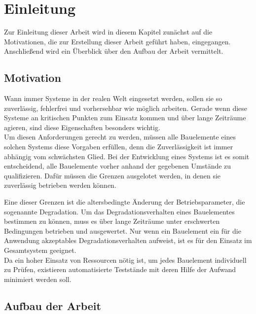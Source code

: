 
\chapter{Einleitung}
\label{chapter_einleitung}
Zur Einleitung dieser Arbeit wird in diesem Kapitel zunächst auf die Motivationen, die zur Erstellung dieser Arbeit geführt haben, eingegangen. Anschließend wird ein Überblick über den Aufbau der Arbeit vermittelt.

\section{Motivation}
Wann immer Systeme in der realen Welt eingesetzt werden, sollen sie so zuverlässig, fehlerfrei und vorhersehbar wie möglich arbeiten. Gerade wenn diese Systeme an kritischen Punkten zum Einsatz kommen und über lange Zeiträume agieren, sind diese Eigenschaften besonders wichtig.\\
Um diesen Anforderungen gerecht zu werden, müssen alle Bauelemente eines solchen Systems diese Vorgaben erfüllen, denn die Zuverlässigkeit ist immer abhängig vom schwächsten Glied.
Bei der Entwicklung eines Systems ist es somit entscheidend, alle Bauelemente vorher anhand der gegebenen Umstände zu qualifizieren. Dafür müssen die Grenzen ausgelotet werden, in denen sie zuverlässig betrieben werden können.

Eine dieser Grenzen ist die altersbedingte Änderung der Betriebsparameter, die sogenannte Degradation.
Um das Degradationsverhalten eines Bauelementes bestimmen zu können, muss es über lange Zeiträume unter erschwerten Bedingungen betrieben und ausgewertet. Nur wenn ein Bauelement ein für die Anwendung akzeptables Degradationsverhalten aufweist, ist es für den Einsatz im Gesamtsystem geeignet.\\
Da ein hoher Einsatz von Ressourcen nötig ist, um jedes Bauelement individuell zu Prüfen, existieren automatisierte Teststände mit deren Hilfe der Aufwand minimiert werden soll.
 
\section{Aufbau der Arbeit}

